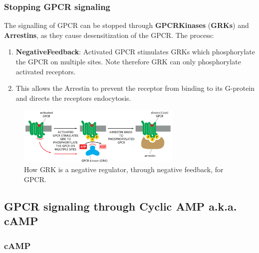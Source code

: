 \documentclass[../main.tex]{subfiles}
\begin{document}
\subsubsection{Stopping GPCR signaling}

The signalling of GPCR can be stopped through \textbf{\gls{GPCRKinases}} (\textbf{GRKs}) and \textbf{\gls{Arrestins}}, as they cause desensitization of the GPCR. The process:
\begin{enumerate}
	\item \textbf{\gls{NegativeFeedback}}: Activated GPCR stimulates GRKs which phosphorylate the GPCR on multiple sites. Note therefore GRK can only phosphorylate activated receptors.
	\item This allows the Arrestin to prevent the receptor from binding to its G-protein and directs the receptors endocytosis. 
\end{enumerate}
\begin{figure}[H]
	\centering
	\includegraphics[width=0.7\textwidth]{GRk}
	\caption{How GRK is a negative regulator, through negative feedback, for GPCR.} 
\end{figure}




\subsection{GPCR signaling through Cyclic AMP a.k.a. cAMP}
\subsubsection{cAMP}
\end{document}
